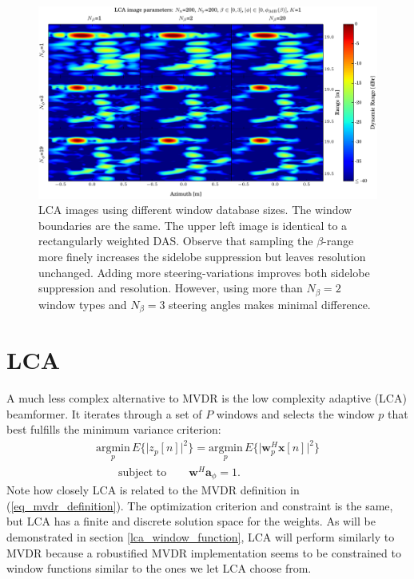 \documentclass[10pt,journal,draftclsnofoot,onecolumn]{IEEEtran}
\let\MYoriglatexcaption\caption               %
\renewcommand{\caption}[2][\relax]{\MYoriglatexcaption[#2]{#2}}
\newcommand\eq[1]{(\ref{#1})}
\newcommand\nn{\nonumber\\}
\newcommand\argmin[1]{\text{arg}\;\underset{#1}{\text{min}}}
\renewcommand\H{^{\scriptscriptstyle H}}
\renewcommand\vec[1]{\boldsymbol{#1}}
\newcommand\1{\vec 1}
\renewcommand*\a{\vec a}
\newcommand*\w{\vec w}
\newcommand*\x{\vec x}
\renewcommand\argmin{\text{argmin}}
\begin{document}

\begin{figure}[t]%
\includegraphics[width=\textwidth]{gfx/oversampling_mosaic.pdf}%
\caption{LCA images using different window database sizes. The window boundaries are the same. The upper left image is identical to a rectangularly weighted DAS. Observe that sampling the $\beta$-range more finely increases the sidelobe suppression but leaves resolution unchanged. Adding more steering-variations improves both sidelobe suppression and resolution. However, using more than  $N_\beta=2$ window types and $N_\beta=3$ steering angles makes minimal difference.}\label{oversampling_mosaic}
\end{figure}


\section{LCA}

A much less complex alternative to MVDR is the low complexity adaptive (LCA) beamformer. It iterates through a set of $P$ windows and selects the window $p$ that best fulfills the minimum variance criterion:
%
\begin{align}
\underset{p}{\argmin}\, E\{\big|z_p[n]\big|^2\} = \underset{p}{\argmin}\, E\big\{\big|\w_{p}\H\x[n]\big|^2\big\}\nn
\qquad\text{subject to}\qquad \w\H\a_\phi = 1.\label{eq_lca_definition}
\end{align}\label{lca_criterion}
%
Note how closely LCA is related to the MVDR definition in \eq{eq_mvdr_definition}. The optimization criterion and constraint is the same, but LCA has a finite and discrete solution space for the weights. As will be demonstrated in section \ref{lca_window_function}, LCA will perform similarly to MVDR because a robustified MVDR implementation seems to be constrained to window functions similar to the ones we let LCA choose from.
\end{document}
